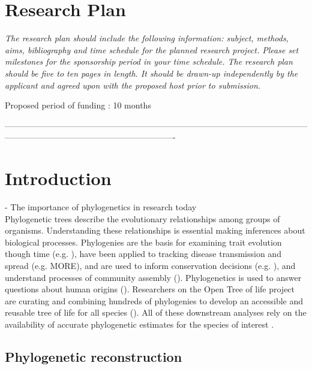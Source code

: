 \documentclass[10pt]{article}
\begin{document}
\section*{Research Plan}                   

\textsl{The research plan should include the following information: subject, methods, aims, bibliography and time schedule for the planned research project. Please set milestones for the sponsorship period in your time schedule.
The research plan should be five to ten pages in length.
It should be drawn-up independently by the applicant and agreed upon with the proposed host prior to submission.}

Proposed period of funding : 10 months


-------------------------------------------------------------------------------------------------------------------------------------------------------------------------
\section*{Introduction}
  - The importance of phylogenetics in research today\\
Phylogenetic trees describe the evolutionary relationships among groups of organisms. Understanding these relationships is essential making inferences about biological processes. Phylogenies are the basis for examining trait evolution though time (e.g. \cite{omeara_testing_2006}), have been applied to tracking disease transmission and spread (e.g. \cite{timme_phylogenetic_2013} MORE), and are used to inform conservation decisions (e.g. \cite{isaac_mammals_2007}), and understand processes of community assembly (\cite{emerson_phylogenetic_2008}). Phylogenetics is used to answer questions about human origins (\cite{endicott_using_2010}). Researchers on the Open Tree of life project are curating and combining hundreds of phylogenies to develop an accessible and reusable tree of life for all species (\cite{drew_lost_2013}). All of these downstream analyses rely on the availability of accurate phylogenetic estimates for the species of interest \cite{stoltzfus_phylotastic!_2013}.


\subsection*{Phylogenetic reconstruction}
\end{document}
